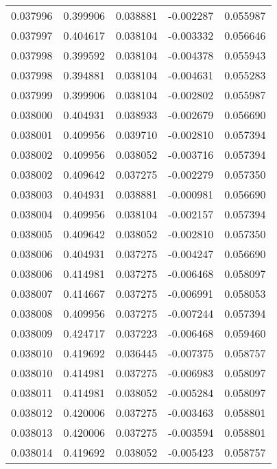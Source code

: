 \begin{tabular}{lrrrr}
0.037996    &  0.399906 &  0.038881 & -0.002287 &             0.055987 \\
0.037997    &  0.404617 &  0.038104 & -0.003332 &             0.056646 \\
0.037998    &  0.399592 &  0.038104 & -0.004378 &             0.055943 \\
0.037998    &  0.394881 &  0.038104 & -0.004631 &             0.055283 \\
0.037999    &  0.399906 &  0.038104 & -0.002802 &             0.055987 \\
0.038000    &  0.404931 &  0.038933 & -0.002679 &             0.056690 \\
0.038001    &  0.409956 &  0.039710 & -0.002810 &             0.057394 \\
0.038002    &  0.409956 &  0.038052 & -0.003716 &             0.057394 \\
0.038002    &  0.409642 &  0.037275 & -0.002279 &             0.057350 \\
0.038003    &  0.404931 &  0.038881 & -0.000981 &             0.056690 \\
0.038004    &  0.409956 &  0.038104 & -0.002157 &             0.057394 \\
0.038005    &  0.409642 &  0.038052 & -0.002810 &             0.057350 \\
0.038006    &  0.404931 &  0.037275 & -0.004247 &             0.056690 \\
0.038006    &  0.414981 &  0.037275 & -0.006468 &             0.058097 \\
0.038007    &  0.414667 &  0.037275 & -0.006991 &             0.058053 \\
0.038008    &  0.409956 &  0.037275 & -0.007244 &             0.057394 \\
0.038009    &  0.424717 &  0.037223 & -0.006468 &             0.059460 \\
0.038010    &  0.419692 &  0.036445 & -0.007375 &             0.058757 \\
0.038010    &  0.414981 &  0.037275 & -0.006983 &             0.058097 \\
0.038011    &  0.414981 &  0.038052 & -0.005284 &             0.058097 \\
0.038012    &  0.420006 &  0.037275 & -0.003463 &             0.058801 \\
0.038013    &  0.420006 &  0.037275 & -0.003594 &             0.058801 \\
0.038014    &  0.419692 &  0.038052 & -0.005423 &             0.058757 \\

\end{tabular}
